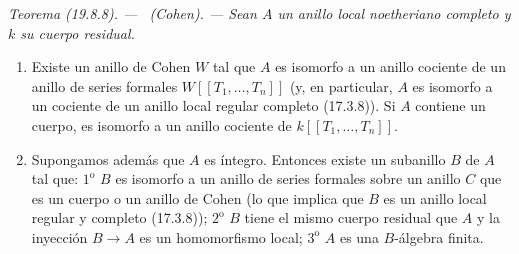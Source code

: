 \documentclass[10pt,oneside]{book}
\makeatletter
\newcommand{\setmanualcurrentlabel}[1]{\def\@currentlabel{#1}}
\newcommand{\oldpage}[2][]{%
  \setcounter{footnote}{0}%
  \marginpar{\scriptsize\textbf{#1}~|~#2}\ignorespaces}
\newenvironment{theorem}[1][]{%
  \setmanualcurrentlabel{#1}\par\medskip\noindent\itshape Teorema (#1). ---\ }{\par}
\makeatother
\begin{document}
\begin{theorem}[19.8.8]
\label{0.19.8.8-es}
\textup{(Cohen).} --- Sean $A$ un anillo local noetheriano completo y $k$ su
cuerpo residual.

\oldpage[0\textsubscript{IV-1}]{112}

\begin{enumerate}
  \item[\textup{(i)}] Existe un anillo de Cohen $W$ tal que $A$ es isomorfo a un anillo
  cociente de un anillo de series formales $W[[T_1,\ldots,T_n]]$ (y, en
  particular, $A$ es isomorfo a un cociente de un anillo local regular
  completo \textup{(17.3.8)}). Si $A$ contiene un cuerpo, es isomorfo a un anillo
  cociente de $k[[T_1,\ldots,T_n]]$.
  \item[\textup{(ii)}] Supongamos además que $A$ es íntegro. Entonces existe un
  subanillo $B$ de $A$ tal que: $1^{\mathrm o}$ $B$ es isomorfo a un anillo de
  series formales sobre un anillo $C$ que es un cuerpo o un anillo de Cohen
  (lo que implica que $B$ es un anillo local regular y completo \textup{(17.3.8)});
  $2^{\mathrm o}$ $B$ tiene el mismo cuerpo residual que $A$ y la inyección
  $B\to A$ es un homomorfismo local; $3^{\mathrm o}$ $A$ es una $B$-álgebra
  finita.
\end{enumerate}
\end{theorem}
\end{document}
